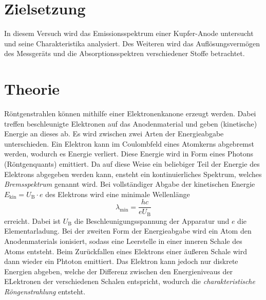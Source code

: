 \section{Zielsetzung}
\label{sec:Ziel}
In diesem Versuch wird das Emissionsspektrum einer Kupfer-Anode untersucht und seine Charakteristika analysiert. Des Weiteren wird das Auflösungsvermögen
des Messgeräts und die Absorptionsspektren verschiedener Stoffe betrachtet. 

\section{Theorie}
\label{sec:Theorie}
Röntgenstrahlen können mithilfe einer Elektronenkanone erzeugt werden. Dabei treffen beschleunigte Elektronen auf das Anodenmaterial und geben (kinetische)
Energie an dieses ab. Es wird zwischen zwei Arten der Energieabgabe unterschieden. Ein Elektron kann im Coulombfeld eines Atomkerns abgebremst werden,
wodurch es Energie verliert. Diese Energie wird in Form eines Photons (Röntgenquants) emittiert. Da auf diese Weise ein beliebiger Teil der Energie des
Elektrons abgegeben werden kann, ensteht ein kontinuierliches Spektrum, welches \textit{Bremsspektrum} genannt wird.
Bei vollständiger Abgabe der kinetischen Energie $E_\text{kin} = U_\text{B} \cdot e$ des Elektrons wird eine minimale Wellenlänge
\begin{equation}
    \label{eqn:lambda_min}
    \lambda_\text{min} = \frac{h c}{e U_\text{B}}
\end{equation}
erreicht. Dabei ist $U_\text{B}$ die Beschleunigungsspannung der Apparatur und $e$ die Elementarladung. 
Bei der zweiten Form der Energieabgabe wird ein Atom den Anodenmaterials ionisiert, sodass eine Leerstelle in einer inneren Schale des Atoms entsteht. 
Beim Zurückfallen eines Elektrons einer äußeren Schale wird dann wieder ein Phtoton emittiert. Das Elektron kann jedoch nur diskrete Energien abgeben,
welche der Differenz zwischen den Energieniveaus der ELektronen der verschiedenen Schalen entspricht, wodurch die \textit{charakteristische Röngenstrahlung}
entsteht.
